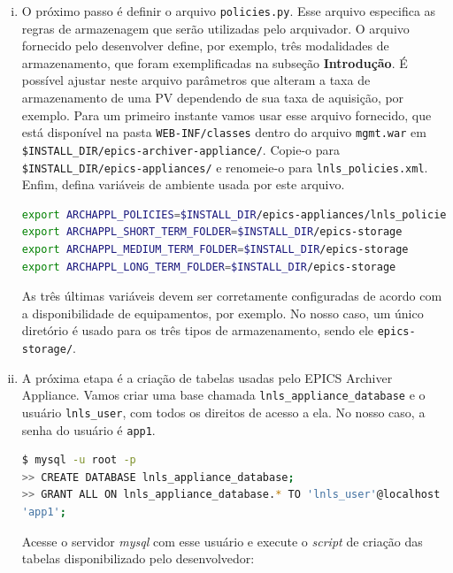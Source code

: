 \begin {enumerate}[i.]
\begin{lstlisting}[language=bash, style=nonumbers]
# A1 uses PatternLayout.
log4j.appender.A1.layout=org.apache.log4j.PatternLayout
log4j.appender.A1.layout.ConversionPattern=%-4r [%t] %-5p %c %x - %m%n
\end{lstlisting}

\item O próximo passo é definir o arquivo \texttt{policies.py}. Esse arquivo
especifica as regras de armazenagem que serão utilizadas pelo arquivador. O
arquivo fornecido pelo desenvolver define, por exemplo, três modalidades de
armazenamento, que foram exemplificadas na subseção \textbf{Introdução}. É
possível ajustar neste arquivo parâmetros que alteram a taxa de armazenamento de
uma PV dependendo de sua taxa de aquisição, por exemplo. Para um primeiro
instante vamos usar esse arquivo fornecido, que está disponível na pasta
\texttt{WEB-INF/classes} dentro do arquivo \texttt{mgmt.war} em
\texttt{\$INSTALL\_DIR/epics-archiver-appliance/}. Copie-o para
\texttt{\$INSTALL\_DIR/epics-appliances/} e renomeie-o para
\texttt{lnls\_policies.xml}. Enfim, defina variáveis de ambiente usada por este
arquivo.

\begin{lstlisting}[language=bash, style=nonumbers]
export ARCHAPPL_POLICIES=$INSTALL_DIR/epics-appliances/lnls_policies.py
export ARCHAPPL_SHORT_TERM_FOLDER=$INSTALL_DIR/epics-storage
export ARCHAPPL_MEDIUM_TERM_FOLDER=$INSTALL_DIR/epics-storage
export ARCHAPPL_LONG_TERM_FOLDER=$INSTALL_DIR/epics-storage
\end{lstlisting}

As três últimas variáveis devem ser corretamente configuradas de acordo com a
disponibilidade de equipamentos, por exemplo. No nosso caso, um único diretório
é usado para os três tipos de armazenamento, sendo ele \texttt{epics-storage/}.

\item A próxima etapa é a criação de tabelas usadas pelo EPICS Archiver
Appliance. Vamos criar uma base chamada \texttt{lnls\_appliance\_database} e o
usuário \texttt{lnls\_user}, com todos os direitos de acesso a ela. No nosso
caso, a senha do usuário é \texttt{app1}. 

\begin{lstlisting}[language=bash, style=nonumbers]
$ mysql -u root -p
>> CREATE DATABASE lnls_appliance_database;
>> GRANT ALL ON lnls_appliance_database.* TO 'lnls_user'@localhost IDENTIFIED BY
'app1';
\end{lstlisting}

Acesse o servidor \textit{mysql} com esse usuário e execute o \textit{script}
de criação das tabelas disponibilizado pelo desenvolvedor:


\end{enumerate}
